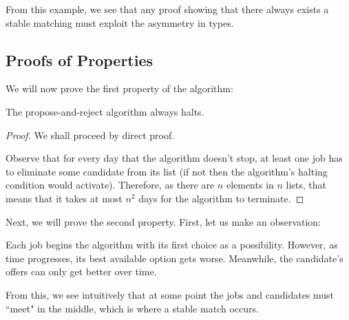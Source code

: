 \documentclass[openany]{book}
\begin{document}
From this example, we see that any proof showing that there always exists a stable matching must exploit the asymmetry in types.

\subsection{Proofs of Properties}
We will now prove the first property of the algorithm:
\begin{lem}
	The propose-and-reject algorithm always halts.
\end{lem}
\begin{proof}
	We shall proceed by direct proof.
	
	Observe that for every day that the algorithm doesn't stop, at least one job has to eliminate some candidate from its list (if not then the algorithm's halting condition would activate). Therefore, as there are $n$ elements in $n$ lists, that means that it takes at most $n^{2}$ days for the algorithm to terminate.
\end{proof}

Next, we will prove the second property. First, let us make an observation:
\begin{obs}
	Each job begins the algorithm with its first choice as a possibility. However, as time progresses, its best available option gets worse. Meanwhile, the candidate's offers can only get better over time.
\end{obs}
From this, we see intuitively that at some point the jobs and candidates must ``meet" in the middle, which is where a stable match occurs.
\end{document}
